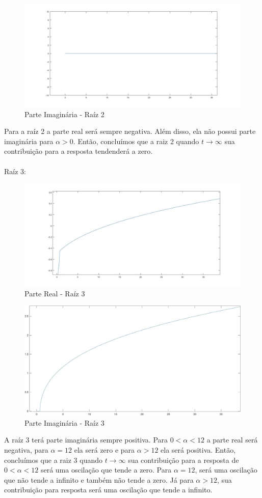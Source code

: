 \documentclass[a4paper,12pt,twoside]{article}
\begin{document}
\begin{figure}[H]
\centering
\includegraphics[scale=0.3]{img2.jpg}
\caption{Parte Imaginária - Raíz 2}
\label{fig:real2}
\end{figure}
Para a raíz 2 a parte real será sempre negativa. Além disso, ela não possui parte imaginária para $\alpha>0$. Então, concluímos que a raiz 2 quando $t\rightarrow \infty$ sua contribuição para a resposta tendenderá a zero. 
\\
\\
Raíz  3:
\begin{figure}[H]
\centering
\includegraphics[scale=0.3]{real3.jpg}
\caption{Parte Real - Raíz 3}
\label{fig:real3}
\end{figure}
\begin{figure}[H]
\centering
\includegraphics[scale=0.2]{img3.jpg}
\caption{Parte Imaginária - Raíz 3}
\label{fig:real3}
\end{figure}
A raíz 3 terá parte imaginária sempre positiva. Para $0<\alpha<12$ a parte real será negativa, para $\alpha=12$ ela será zero e para $\alpha>12$ ela será positiva. Então, concluímos que a raiz 3 quando $t\rightarrow \infty$ sua contribuição para a resposta de  $0<\alpha<12$ será uma oscilação que tende a zero. Para $\alpha=12$, será uma oscilação que não tende a infinito e também não tende a zero. Já para $\alpha>12$, sua contribuição para resposta será uma oscilação que tende a infinito.
\end{document}
